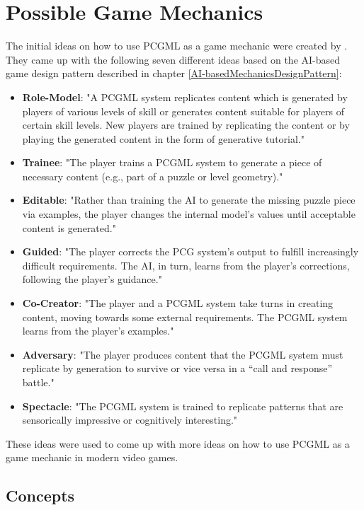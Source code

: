 \documentclass[MGS,Master,english]{twbook}%
\begin{document}
\chapter{Possible Game Mechanics}
The initial ideas on how to use PCGML as a game mechanic were created by \cite{pcgml::paper}. They came up with the following seven different ideas based on the AI-based game design pattern described in chapter \ref{AI-basedMechanicsDesignPattern}:
\begin{itemize}
	\item \textbf{Role-Model}: "A \ac{PCGML} system replicates content which is generated by players of various levels of skill or generates content suitable for players of certain skill levels. New players are trained by replicating the content or by playing the generated content in the form of generative tutorial." \cite{pcgml::paper}
	\item \textbf{Trainee}: "The player trains a \ac{PCGML} system to generate a piece of necessary content (e.g., part of a puzzle or level geometry)." \cite{pcgml::paper}
	\item \textbf{Editable}: "Rather than training the AI to generate the missing puzzle piece via examples, the player changes the internal model’s values until acceptable content is generated." \cite{pcgml::paper}
	\item \textbf{Guided}: "The player corrects the \ac{PCG} system’s output to fulfill increasingly difficult requirements. The \ac{AI}, in turn, learns from the player’s corrections, following the player’s guidance." \cite{pcgml::paper}
	\item \textbf{Co-Creator}: "The player and a \ac{PCGML} system take turns in creating content, moving towards some external requirements. The \ac{PCGML} system learns from the player’s examples." \cite{pcgml::paper} 
	\item \textbf{Adversary}: "The player produces content that the \ac{PCGML} system must replicate by generation to survive or vice versa in a “call and response” battle." \cite{pcgml::paper}
	\item \textbf{Spectacle}: "The \ac{PCGML} system is trained to replicate patterns that are sensorically impressive or cognitively interesting." \cite{pcgml::paper}
\end{itemize}
These ideas were used to come up with more ideas on how to use PCGML as a game mechanic in modern video games.

\section{Concepts}
\end{document}
